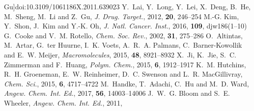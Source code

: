 \documentclass[twoside,twocolumn,9pt]{article}
\begin{document}
\begin{mcitethebibliography}{79}
  Gu]{doi:10.3109/1061186X.2011.639023}
Y.~Lai, Y.~Long, Y.~Lei, X.~Deng, B.~He, M.~Sheng, M.~Li and Z.~Gu, \emph{J.
  Drug. Target.}, 2012, \textbf{20}, 246--254\relax
\mciteBstWouldAddEndPuncttrue
\mciteSetBstMidEndSepPunct{\mcitedefaultmidpunct}
{\mcitedefaultendpunct}{\mcitedefaultseppunct}\relax
\EndOfBibitem
{}
M.-G. Kim, Y.~Shon, J.~Kim and Y.-K. Oh, \emph{J. Natl. Cancer. Inst.}, 2016,
  \textbf{109}, djw186(1--10)\relax
\mciteBstWouldAddEndPuncttrue
\mciteSetBstMidEndSepPunct{\mcitedefaultmidpunct}
{\mcitedefaultendpunct}{\mcitedefaultseppunct}\relax
\EndOfBibitem
{}
G.~Cooke and V.~M. Rotello, \emph{Chem. Soc. Rev.}, 2002, \textbf{31},
  275--286\relax
\mciteBstWouldAddEndPuncttrue
\mciteSetBstMidEndSepPunct{\mcitedefaultmidpunct}
{\mcitedefaultendpunct}{\mcitedefaultseppunct}\relax
\EndOfBibitem
{}
O.~Altintas, M.~Artar, G.~ter Huurne, I.~K. Voets, A.~R.~A. Palmans,
  C.~Barner-Kowollik and E.~W. Meijer, \emph{Macromolecules}, 2015,
  \textbf{48}, 8921--8932\relax
\mciteBstWouldAddEndPuncttrue
\mciteSetBstMidEndSepPunct{\mcitedefaultmidpunct}
{\mcitedefaultendpunct}{\mcitedefaultseppunct}\relax
\EndOfBibitem
{}
X.~Ji, K.~Jie, S.~C. Zimmerman and F.~Huang, \emph{Polym. Chem.}, 2015,
  \textbf{6}, 1912--1917\relax
\mciteBstWouldAddEndPuncttrue
\mciteSetBstMidEndSepPunct{\mcitedefaultmidpunct}
{\mcitedefaultendpunct}{\mcitedefaultseppunct}\relax
\EndOfBibitem
{}
K.~M. Hutchins, R.~H. Groeneman, E.~W. Reinheimer, D.~C. Swenson and L.~R.
  MacGillivray, \emph{Chem. Sci.}, 2015, \textbf{6}, 4717--4722\relax
\mciteBstWouldAddEndPuncttrue
\mciteSetBstMidEndSepPunct{\mcitedefaultmidpunct}
{\mcitedefaultendpunct}{\mcitedefaultseppunct}\relax
\EndOfBibitem
{}
M.~Handke, T.~Adachi, C.~Hu and M.~D. Ward, \emph{Angew. Chem. Int. Ed.}, 2017,
  \textbf{56}, 14003--14006\relax
\mciteBstWouldAddEndPuncttrue
\mciteSetBstMidEndSepPunct{\mcitedefaultmidpunct}
{\mcitedefaultendpunct}{\mcitedefaultseppunct}\relax
\EndOfBibitem
{}
J.~W.~G. Bloom and S.~E. Wheeler, \emph{Angew. Chem. Int. Ed.}, 2011,

\end{mcitethebibliography}
\end{document}
